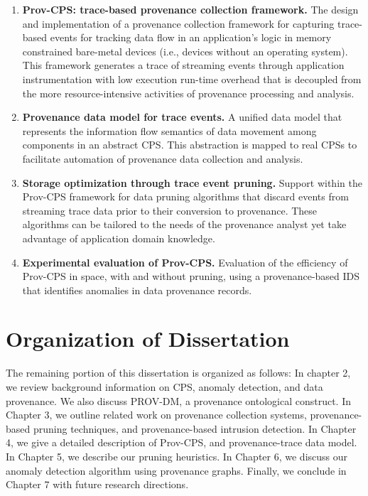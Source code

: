 \begin{enumerate}



\item \textbf{Prov-CPS: trace-based provenance collection framework.} The design and implementation of a provenance collection framework for capturing trace-based events for tracking data flow in an application's logic in memory constrained bare-metal devices (i.e., devices without an operating system). This framework generates a trace of streaming events through application instrumentation with low execution run-time overhead that is decoupled from the more resource-intensive activities of provenance processing and analysis.

\item \textbf{Provenance data model for trace events.} A unified data model that represents the information flow semantics of data movement among components in an abstract CPS. This abstraction is mapped to real CPSs to facilitate automation of provenance data collection and analysis.

\item \textbf{Storage optimization through trace event pruning.} Support within the Prov-CPS framework for data pruning algorithms that discard events from streaming trace data prior to their conversion to provenance. These algorithms can be tailored to the needs of the provenance analyst yet take advantage of application domain knowledge.

\item \textbf{Experimental evaluation of Prov-CPS.} Evaluation of the efficiency of Prov-CPS in space, with and without pruning, using a provenance-based IDS that identifies anomalies in data provenance records.



\end{enumerate}

\section*{Organization of Dissertation}

The remaining portion of this dissertation is organized as follows: In chapter 2, we review background information on CPS, anomaly detection, and data provenance. We also discuss PROV-DM, a provenance ontological construct. In Chapter 3, we outline related work on provenance collection systems, provenance-based pruning techniques, and provenance-based intrusion detection. In Chapter 4, we give a detailed description of Prov-CPS, and provenance-trace data model. In Chapter 5, we describe our pruning heuristics. In Chapter 6, we discuss our anomaly detection algorithm using provenance graphs. Finally, we conclude in Chapter 7 with future research directions.

